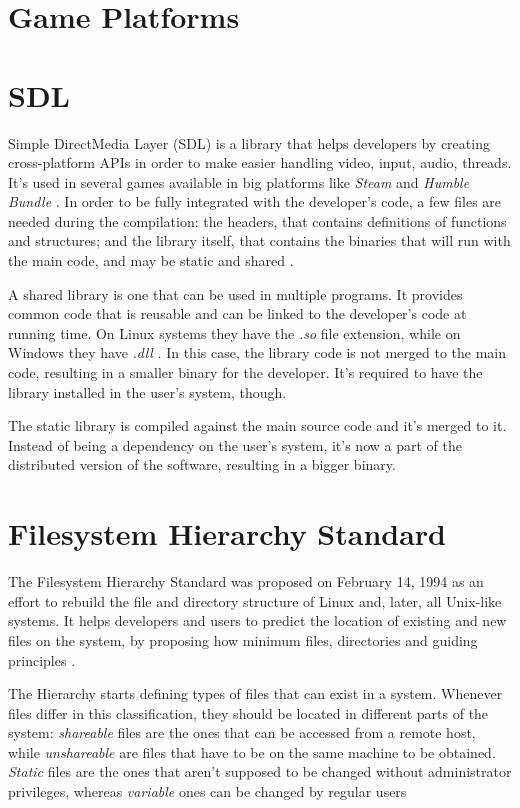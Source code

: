 \section{Game Platforms}
\label {sec:game_platforms}


\section{SDL}
\label {sec:sdl}

Simple DirectMedia Layer (SDL) is a library that helps developers by creating cross-platform APIs in order to make easier handling video, input, audio, threads. It's used in several games available in big platforms like \textit{Steam} and \textit{Humble Bundle} \cite{sdl2017}. In order to be fully integrated with the developer's code, a few files are needed during the compilation: the headers, that contains definitions of functions and structures; and the library itself, that contains the binaries that will run with the main code, and may be static and shared \cite{lazyfoo2017}.

A shared library is one that can be used in multiple programs. It provides common code that is reusable and can be linked to the developer's code at running time. On Linux systems they have the \textit{.so} file extension, while on Windows they have \textit{.dll} \cite{howto2017shared}. In this case, the library code is not merged to the main code, resulting in a smaller binary for the developer. It's required to have the library installed in the user's system, though.

The static library is compiled against the main source code and it's merged to it. Instead of being a dependency on the user's system, it's now a part of the distributed version of the software, resulting in a bigger binary.


\section{Filesystem Hierarchy Standard}
\label {sec:fhs}

The Filesystem Hierarchy Standard was proposed on February 14, 1994 as an effort to rebuild the file and directory structure of Linux and, later, all Unix-like systems. It helps developers and users to predict the location of existing and new files on the system, by proposing how minimum files, directories and guiding principles \cite{allbery2015filesystem}.

The Hierarchy starts defining types of files that can exist in a system. Whenever files differ in this classification, they should be located in different parts of the system: \textit{shareable} files are the ones that can be accessed from a remote host, while \textit{unshareable} are files that have to be on the same machine to be obtained. \textit{Static} files are the ones that aren't supposed to be changed without administrator privileges, whereas \textit{variable} ones can be changed by regular users \cite{allbery2015filesystem}

